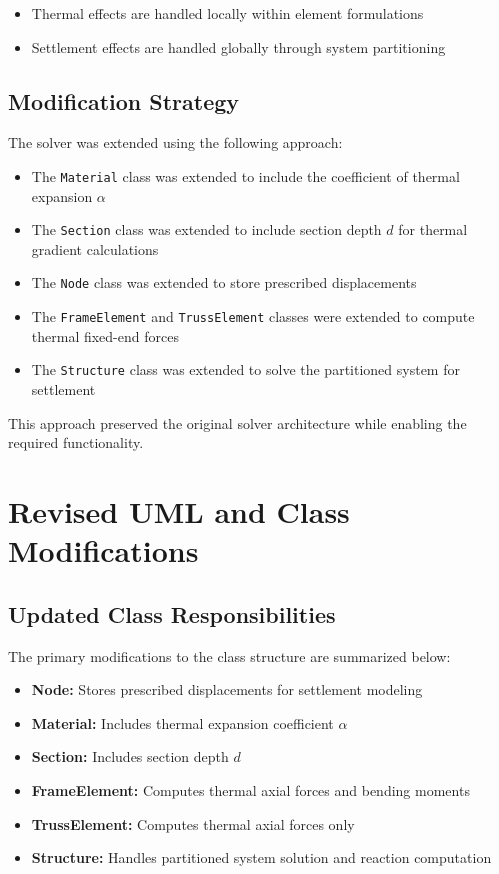 \begin{itemize}
    \item Thermal effects are handled locally within element formulations
    \item Settlement effects are handled globally through system partitioning
\end{itemize}

\subsection{Modification Strategy}

The solver was extended using the following approach:

\begin{itemize}
    \item The \texttt{Material} class was extended to include the coefficient of thermal expansion $\alpha$
    \item The \texttt{Section} class was extended to include section depth $d$ for thermal gradient calculations
    \item The \texttt{Node} class was extended to store prescribed displacements
    \item The \texttt{FrameElement} and \texttt{TrussElement} classes were extended to compute thermal fixed-end forces
    \item The \texttt{Structure} class was extended to solve the partitioned system for settlement
\end{itemize}

This approach preserved the original solver architecture while enabling the required functionality.

\pagebreak
\section{Revised UML and Class Modifications}

\subsection{Updated Class Responsibilities}

The primary modifications to the class structure are summarized below:

\begin{itemize}
    \item \textbf{Node:} Stores prescribed displacements for settlement modeling
    \item \textbf{Material:} Includes thermal expansion coefficient $\alpha$
    \item \textbf{Section:} Includes section depth $d$
    \item \textbf{FrameElement:} Computes thermal axial forces and bending moments
    \item \textbf{TrussElement:} Computes thermal axial forces only
    \item \textbf{Structure:} Handles partitioned system solution and reaction computation
\end{itemize}

